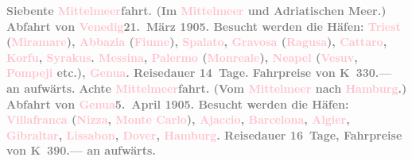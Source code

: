            \textcolor{gray}{\textbf{\textbf{Siebente \textcolor{pink}{Mittelmeer}{}\ledrightnote{\textcolor{pink}{Mittelmeer}}fahrt.}
                  (Im \textcolor{pink}{Mittelmeer}{}\ledrightnote{\textcolor{pink}{Mittelmeer}} und Adriatischen Meer.) Abfahrt
                  von \textcolor{pink}{Venedig}{}\ledrightnote{\textcolor{pink}{Venedig}}{ }\textbf{21. März 1905}. Besucht werden die Häfen: \textcolor{pink}{Triest}{}\ledrightnote{\textcolor{pink}{Triest}} (\textcolor{pink}{Miramare}{}\ledrightnote{\textcolor{pink}{Schloss Miramare}}), \textcolor{pink}{Abbazia}{}\ledrightnote{\textcolor{pink}{Opatija}} (\textcolor{pink}{Fiume}{}\ledrightnote{\textcolor{pink}{Rijeka}}), \textcolor{pink}{Spalato}{}\ledrightnote{\textcolor{pink}{Split}}, \textcolor{pink}{Gravosa}{}\ledrightnote{\textcolor{pink}{Dubrovnik}} (\textcolor{pink}{Ragusa}{}\ledrightnote{\textcolor{pink}{Dubrovnik}}), \textcolor{pink}{Cattaro}{}\ledrightnote{\textcolor{pink}{Kotor}}, \textcolor{pink}{Korfu}{}\ledrightnote{\textcolor{pink}{Korfu}}, \textcolor{pink}{Syrakus}{}\ledrightnote{\textcolor{pink}{Syrakus}}. \textcolor{pink}{Messina}{}\ledrightnote{\textcolor{pink}{Messina}}, \textcolor{pink}{Palermo}{}\ledrightnote{\textcolor{pink}{Palermo}} (\textcolor{pink}{Monreale}{}\ledrightnote{\textcolor{pink}{Monreale}}), \textcolor{pink}{Neapel}{}\ledrightnote{\textcolor{pink}{Neapel}} (\textcolor{pink}{Vesuv}{}\ledrightnote{\textcolor{pink}{Vesuv}}, \textcolor{pink}{Pompeji}{}\ledrightnote{\textcolor{pink}{Pompei}} etc.), \textcolor{pink}{Genua}{}\ledrightnote{\textcolor{pink}{Genua}}. Reisedauer 14 Tage. Fahrpreise von \textbf{K 330.—} an aufwärts.}}\pend
           \pstart
           \textcolor{gray}{\textbf{\textbf{Achte \textcolor{pink}{Mittelmeer}{}\ledrightnote{\textcolor{pink}{Mittelmeer}}fahrt.}
                  (Vom \textcolor{pink}{Mittelmeer}{}\ledrightnote{\textcolor{pink}{Mittelmeer}} nach \textcolor{pink}{Hamburg}{}\ledrightnote{\textcolor{pink}{Hamburg}}.) Abfahrt von \textcolor{pink}{Genua}{}\ledrightnote{\textcolor{pink}{Genua}}{ }\textbf{5. April 1905}. Besucht werden die Häfen: \textcolor{pink}{Villafranca}{}\ledrightnote{\textcolor{pink}{Villefranche-sur-Mer}}
                     (\textcolor{pink}{Nizza}{}\ledrightnote{\textcolor{pink}{Nizza}}, \textcolor{pink}{Monte
                     Carlo}{}\ledrightnote{\textcolor{pink}{Monte Carlo}}), \textcolor{pink}{Ajaccio}{}\ledrightnote{\textcolor{pink}{Ajaccio}}, \textcolor{pink}{Barcelona}{}\ledrightnote{\textcolor{pink}{Barcelona}}, \textcolor{pink}{Algier}{}\ledrightnote{\textcolor{pink}{Algiers}}, \textcolor{pink}{Gibraltar}{}\ledrightnote{\textcolor{pink}{Gibraltar}}, \textcolor{pink}{Lissabon}{}\ledrightnote{\textcolor{pink}{Lissabon}}, \textcolor{pink}{Dover}{}\ledrightnote{\textcolor{pink}{Dover}}, \textcolor{pink}{Hamburg}{}\ledrightnote{\textcolor{pink}{Hamburg}}. Reisedauer 16 Tage, Fahrpreise von \textbf{K 390.—} an aufwärts.}}\pend
